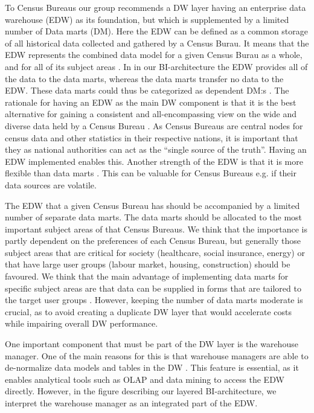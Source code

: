 To Census Bureaus our group recommends a DW layer having an enterprise data warehouse (EDW) 
as its foundation, but which is supplemented by a limited number of Data marts (DM). 
Here the EDW can be defined as a common storage of all historical data collected and 
gathered by a Census Burau. 
It means that the EDW represents the combined data model for a given Census Burau as a whole, 
and for all of its subject areas \cite[chapter~32.2]{CourseLitt}. 
In in our BI-architecture the EDW provides all of the data to the data marts, 
whereas the data marts transfer no data to the EDW. 
These data marts could thus be categorized as dependent DM:s \cite{l2video}. 
The rationale for having an EDW as the main DW component is that it is the best alternative for 
gaining a consistent and 
all-encompassing view on the wide and diverse data held by a Census Bureau \cite[chapter~32.2]{CourseLitt}. 
As Census Bureaus are central nodes for census data and other statistics in their respective nations, 
it is important that they as national authorities can act as the “single source of the truth”. 
Having an EDW implemented enables this. 
Another strength of the EDW is that it is more flexible than data marts \cite{l3video}. 
This can be valuable for Census Bureaus e.g. if their data sources are volatile.  

The EDW that a given Census Bureau has should be accompanied by a limited number of separate data marts. 
The data marts should be allocated to the most important subject areas of that Census Bureaus. 
We think that the importance is partly dependent on the preferences of each Census Bureau, 
but generally those subject areas that are critical for society (healthcare, social insurance, energy) 
or that have large user groups (labour market, housing, construction) should be favoured. 
We think that the main advantage of implementing data marts for specific subject areas are 
that data can be supplied in forms that are tailored to the target user groups  \cite[chapter~31.4.1]{CourseLitt}. 
However, keeping the number of data marts moderate is crucial, as to avoid creating a duplicate DW layer 
that would accelerate costs while impairing overall DW performance.   

One important component that must be part of the DW layer is the warehouse manager. 
One of the main reasons for this is that warehouse managers are able to de-normalize data models and 
tables in the DW \cite[chapter~31.2.4]{CourseLitt}. 
This feature is essential, as it enables analytical tools such as OLAP and 
data mining to access the EDW directly. 
However, in the figure describing our layered BI-architecture, 
we interpret the warehouse manager as an integrated part of the EDW.  

